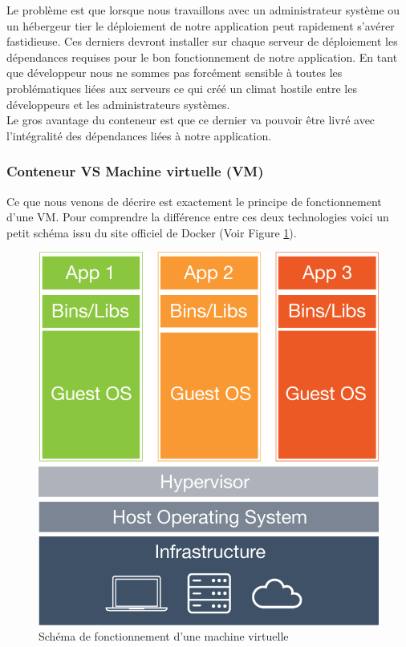\documentclass{report}
\begin{document}
        Le problème est que lorsque nous travaillons avec un administrateur système ou un hébergeur tier le déploiement de notre application peut rapidement s’avérer fastidieuse. Ces derniers devront installer sur chaque serveur de déploiement les dépendances requises pour le bon fonctionnement de notre application. En tant que développeur nous ne sommes pas forcément sensible à toutes les problématiques liées aux serveurs ce qui créé un climat hostile entre les développeurs et les administrateurs systèmes.\\

        Le gros avantage du conteneur est que ce dernier va pouvoir être livré avec l’intégralité des dépendances liées à notre application.

        \subsubsection{Conteneur VS Machine virtuelle (VM)}
        Ce que nous venons de décrire est exactement le principe de fonctionnement d’une VM. Pour comprendre la différence entre ces deux technologies voici un petit schéma issu du site officiel de Docker (Voir Figure \ref{Virtual Machine}).\\

        \begin{figure}
          \begin{center}
            \includegraphics[scale=0.2]{images/virtualMachine.png}
          \end{center}
          \caption{Schéma de fonctionnement d'une machine virtuelle}
          \label{Virtual Machine}
        \end{figure}
\end{document}
